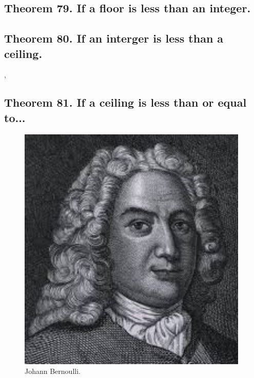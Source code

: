 \documentclass[preview]{standalone}
\begin{document}
\subsection[If a floor is less than an integer.]
    {
        \color{section}Theorem 79. \color{black} If a floor is less than an integer.
    }

\pagebreak


\subsection[If an interger is less than a ceiling.]
    {
        \color{section}Theorem 80. \color{black} If an interger is less than a ceiling.
    }

\sep


\subsection[If a ceiling is less than or equal to...]
    {
        \color{section}Theorem 81. \color{black} If a ceiling is less than or equal to...
    }

\pagebreak


\begin{figure}[!h]
    \centering
    \includegraphics[width=11cm]{../resources/jpg/2.3.functions/bernoulli.jpg}
    \caption*{Johann Bernoulli.}
\end{figure}
\end{document}
